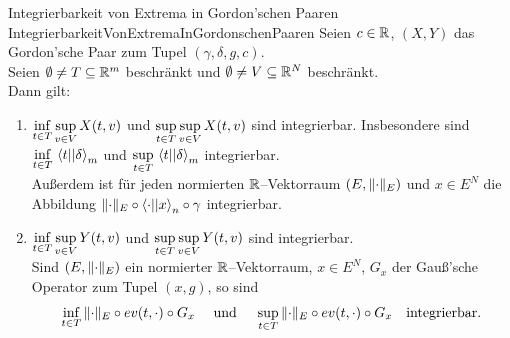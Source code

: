 \begin{lemma}{Integrierbarkeit von Extrema in Gordon'schen Paaren}
             {IntegrierbarkeitVonExtremaInGordonschenPaaren}
Seien $c \in \mathbb{R}$, $(X, Y)$ das Gordon'sche Paar zum Tupel
$(\gamma, \delta, g, c)$.\\
Seien $\emptyset \neq T \subseteq \mathbb{R}^m$ beschränkt
und $\emptyset \neq V \subseteq \mathbb{R}^N$ beschränkt.\\
Dann gilt:
\begin{enumerate}[(1)]
	\item \label{IntegrierbarkeitVonExtremaInGordonschenPaaren1}
	$\underset{t \in T}\inf\,\underset{v \in V}\sup\,X(t, v)$ und $\underset{t \in T}\sup\,\underset{v \in V}\sup\,X(t, v)$
	sind integrierbar.\absatz
	Insbesondere sind $\underset{t \in T}\inf\,\left\langle t ||\delta\right\rangle_m$
	und $\underset{t \in T}\sup\,\left\langle t ||\delta\right\rangle_m$ integrierbar.\\
	Außerdem ist für jeden
	normierten $\mathbb{R}$--Vektorraum $(E, \lVert\cdot\rVert_E)$ und $x \in E^N$
die Abbildung $\lVert\cdot\rVert_E \circ \left\langle \cdot ||x\right\rangle_n \circ \gamma$ integrierbar.
	\item \label{IntegrierbarkeitVonExtremaInGordonschenPaaren2}
	$\underset{t \in T}\inf\,\underset{v \in V}\sup\,Y(t, v)$ und $\underset{t \in T}\sup\,\underset{v \in V}\sup\,Y(t, v)$
	sind integrierbar.\\
	Sind $(E, \lVert\cdot\rVert_E)$ ein normierter $\mathbb{R}$--Vektorraum, 
	$x \in E^N$, $G_x$ der Gauß'sche Operator zum Tupel $(x,g)$, so sind
	\[\inf_{t \in T}\, \lVert\cdot\rVert_E \circ ev(t,\cdot)\circ G_x \quad\text{ und } 
	  \quad \sup_{t \in T}\, \lVert\cdot\rVert_E \circ ev(t,\cdot)\circ G_x \quad
	\text{integrierbar.}\]
\end{enumerate}
\end{lemma}
